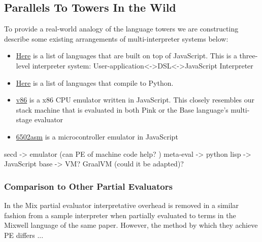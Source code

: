 \documentclass{article}
\theoremstyle{definition}
\begin{document}
\subsection{Parallels To Towers In the Wild}
To provide a real-world analogy of the language towers we are constructing describe some existing arrangements of multi-interpreter systems below:
\begin{itemize}
	\item \href{https://github.com/jashkenas/coffeescript/wiki/List-of-languages-that-compile-to-JS}{Here} is a list of languages that are built on top of JavaScript. This is a three-level interpreter system: User-application<->DSL<->JavaScript Interpreter
	\item \href{https://github.com/vindarel/languages-that-compile-to-python#other-languages-that-target-the-python-platform}{Here} is a list of languages that compile to Python.
	\item \href{https://github.com/copy/v86}{v86} is a x86 CPU emulator written in JavaScript. This closely resembles our stack machine that is evaluated in both Pink or the Base language's multi-stage evaluator
	\item \href{http://6502asm.com/}{6502asm} is a microcontroller emulator in JavaScript
\end{itemize}
secd -> emulator (can PE of machine code help? \cite{srinivasan2015partial})
meta-eval -> python
lisp -> JavaScript
base -> VM? GraalVM (could it be adapted)?

\subsubsection{Comparison to Other Partial Evaluators}
In the Mix partial evaluator \cite{jones1989mix} interpretative overhead is removed in a similar fashion from a sample interpreter when partially evaluated to terms in the Mixwell language of the same paper. However, the method by which they achieve PE differs ...
\end{document}
